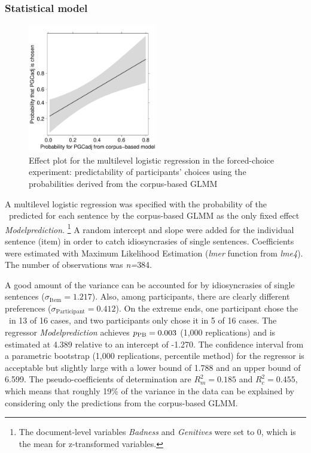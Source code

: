 \subsubsection{Statistical model}

\begin{figure}[htbp!]
\centering
\includegraphics[width=0.5\textwidth]{../R/output/fc_effects}
\caption{Effect plot for the multilevel logistic regression in the forced-choice experiment: predictability of participants' choices using the probabilities derived from the corpus-based GLMM}
\label{fig:afc:effects}
\end{figure}

A multilevel logistic regression was specified with the probability of the \PGCa\ predicted for each sentence by the corpus-based GLMM as the only fixed effect \textit{Modelprediction}.%
\footnote{The document-level variables \textit{Badness} and \textit{Genitives} were set to 0, which is the mean for z-transformed variables.}
A random intercept and slope were added for the individual sentence (item) in order to catch idiosyncrasies of single sentences.
Coefficients were estimated with Maximum Likelihood Estimation (\textit{lmer} function from \textit{lme4}).
The number of observations was \textit{n=}384.

A good amount of the variance can be accounted for by idiosyncrasies of single sentences ($\sigma_{\text{Item}}=1.217$).%
Also, among participants, there are clearly different preferences ($\sigma_{\text{Participant}}=0.412$).
On the extreme ends, one participant chose the \PGCa\ in 13 of 16 cases, and two participants only chose it in 5 of 16 cases.
The regressor \textit{Modelprediction} achieves $p_{\text{PB}}=0.003$ (1,000 replications) and is estimated at 4.389 relative to an intercept of -1.270.
The confidence interval from a parametric bootstrap (1,000 replications, percentile method) for the regressor is acceptable but slightly large with a lower bound of 1.788 and an upper bound of 6.599.
The pseudo-coefficients of determination are $R^2_{m}=0.185$ and $R^2_{c}=0.455$, which means that roughly 19\% of the variance in the data can be explained by considering only the predictions from the corpus-based GLMM.

